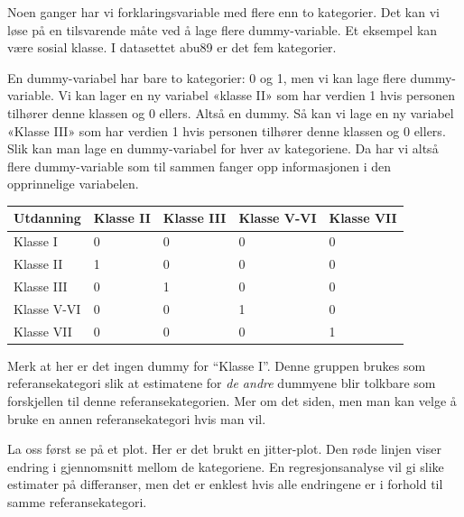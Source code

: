 \documentclass[
  norsk,
  letterpaper,
  DIV=11,
  numbers=noendperiod]{scrreprt}
\newenvironment{Shaded}{\begin{snugshade}}{\end{snugshade}}
\newcommand{\AttributeTok}[1]{\textcolor[rgb]{0.40,0.45,0.13}{#1}}
\newcommand{\CommentTok}[1]{\textcolor[rgb]{0.37,0.37,0.37}{#1}}
\newcommand{\DecValTok}[1]{\textcolor[rgb]{0.68,0.00,0.00}{#1}}
\newcommand{\FunctionTok}[1]{\textcolor[rgb]{0.28,0.35,0.67}{#1}}
\newcommand{\NormalTok}[1]{\textcolor[rgb]{0.00,0.23,0.31}{#1}}
\newcommand{\SpecialCharTok}[1]{\textcolor[rgb]{0.37,0.37,0.37}{#1}}
\newcommand{\StringTok}[1]{\textcolor[rgb]{0.13,0.47,0.30}{#1}}
\theoremstyle{definition}
\theoremstyle{remark}
\begin{document}
Noen ganger har vi forklaringsvariable med flere enn to kategorier. Det
kan vi løse på en tilsvarende måte ved å lage flere dummy-variable. Et
eksempel kan være sosial klasse. I datasettet abu89 er det fem
kategorier.

En dummy-variabel har bare to kategorier: 0 og 1, men vi kan lage flere
dummy-variable. Vi kan lager en ny variabel «klasse II» som har verdien
1 hvis personen tilhører denne klassen og 0 ellers. Altså en dummy. Så
kan vi lage en ny variabel «Klasse III» som har verdien 1 hvis personen
tilhører denne klassen og 0 ellers. Slik kan man lage en dummy-variabel
for hver av kategoriene. Da har vi altså flere dummy-variable som til
sammen fanger opp informasjonen i den opprinnelige variabelen.

\begin{longtable}[]{@{}lllll@{}}
\toprule\noalign{}
Utdanning & Klasse II & Klasse III & Klasse V-VI & Klasse VII \\
\midrule\noalign{}
\endhead
\bottomrule\noalign{}
\endlastfoot
Klasse I & 0 & 0 & 0 & 0 \\
Klasse II & 1 & 0 & 0 & 0 \\
Klasse III & 0 & 1 & 0 & 0 \\
Klasse V-VI & 0 & 0 & 1 & 0 \\
Klasse VII & 0 & 0 & 0 & 1 \\
\end{longtable}

Merk at her er det ingen dummy for ``Klasse I''. Denne gruppen brukes
som referansekategori slik at estimatene for \emph{de andre} dummyene
blir tolkbare som forskjellen til denne referansekategorien. Mer om det
siden, men man kan velge å bruke en annen referansekategori hvis man
vil.

La oss først se på et plot. Her er det brukt en jitter-plot. Den røde
linjen viser endring i gjennomsnitt mellom de kategoriene. En
regresjonsanalyse vil gi slike estimater på differanser, men det er
enklest hvis alle endringene er i forhold til samme referansekategori.

\begin{Shaded}
\end{Shaded}
\end{document}
